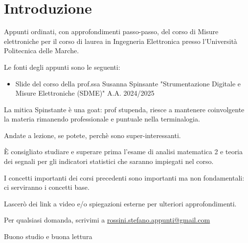 \section*{Introduzione}

 

Appunti ordinati, con approfondimenti passo-passo, del corso di Misure elettroniche per il corso di laurea in Ingegneria Elettronica 
presso l’Università Politecnica delle Marche. \newline
        



Le fonti degli appunti sono le seguenti: 

\begin{itemize}
    
    \item Slide del corso della prof.ssa Susanna Spinsante 
    "Strumentazione Digitale e Misure Elettroniche (SDME)" 
    A.A. 2024/2025 
    

\end{itemize}

La mitica Spinstante è una goat: prof stupenda, riesce a mantenere coinvolgente la materia rimanendo professionale e puntuale nella terminalogia. \newline 

Andate a lezione, se potete, perchè sono super-interessanti. \newline 

È consigliato studiare e superare prima l’esame di analisi matematica 2 e teoria dei segnali per gli indicatori statistici che saranno impiegati nel corso. \newline 

I concetti importanti dei corsi precedenti sono importanti ma non fondamentali: ci serviranno i concetti base. \newline 

Lascerò dei link a video e/o spiegazioni esterne per ulteriori approfondimenti. \newline 

Per qualsiasi domanda, scrivimi a \href{mailto:rossini.stefano.appunti@gmail.com}{rossini.stefano.appunti@gmail.com} \newline

Buono studio e buona lettura \newline

\newpage 






